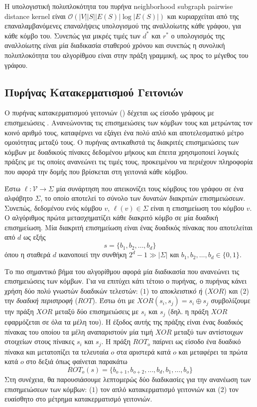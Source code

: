 Η υπολογιστική πολυπλοκότητα του πυρήνα neighborhood subgraph pairwise distance kernel είναι $\mathcal{O}(|V| |S| |E(S)| \log |E(S)|)$ και κυριαρχείται από της επαναλαμβανόμενες επαναλήψεις υπολογισμού της αναλλοίωτης κάθε γράφου, για κάθε κόμβο του.
Συνεπώς για μικρές τιμές των $d^*$ και $r^*$ ο υπολογισμός της αναλλοίωτης είναι μία διαδικασία σταθερού χρόνου και συνεπώς η συνολική πολυπλοκότητα του αλγορίθμου είναι στην πράξη γραμμική, ως προς το μέγεθος του γράφου.

\subsection{Πυρήνας Κατακερματισμού Γειτονιών}
\label{ssec:nh}
Ο πυρήνας κατακερματισμού γειτονιών () δέχεται ως είσοδο γράφους με επισημειώσεις \cite{Hido2009}.
Ανανεώνοντας τις επισημειώσεις των κόμβων τους και μετρώντας τον κοινό αριθμό τους, καταφέρνει να εξάγει ένα πολύ απλό και αποτελεσματικό μέτρο ομοιότητας μεταξύ τους.
Ο πυρήνας αντικαθιστά τις διακριτές επισημειώσεις των κόμβων με δυαδικούς πίνακες δεδομένου μήκους και έπειτα χρησιμοποιεί λογικές πράξεις με τις οποίες ανανεώνει τις τιμές τους, προκειμένου να περιέχουν πληροφορία που αφορά την δομής που βρίσκεται στη γειτονιά κάθε κόμβου.

Έστω $\ell : \mathcal{V} \rightarrow \Sigma$ μία συνάρτηση που απεικονίζει τους κόμβους του γράφου σε ένα αλφάβητο $\Sigma$, το οποίο αποτελεί το σύνολο των δυνατών διακριτών επισημειώσεων.
Συνεπώς, δεδομένου ενός κόμβου $v$, $\ell(v) \in \Sigma$  είναι η επισημείωση του κόμβου $v$.
Ο αλγόριθμος πρώτα μετασχηματίζει κάθε διακριτό κόμβο σε μία δυαδική επισημείωση.
Μία διακριτή επισημείωση είναι ένας δυαδικός πίνακας που αποτελείται από $d$  ως εξής
\begin{equation*}
    s = \{ b_1, b_2, \ldots, b_d \}
\end{equation*}
όπου η σταθερά $d$ ικανοποιεί την συνθήκη $2^d - 1 \gg |\Sigma|$ και $b_1, b_2, \ldots, b_d \in \{0, 1\}$.

Το πιο σημαντικό βήμα του αλγορίθμου αφορά μία διαδικασία που ανανεώνει τις επισημειώσεις των κόμβων.
Για να επιτύχει κάτι τέτοιο ο πυρήνας, ο πυρήνας κάνει χρήση δύο πολύ γνωστών δυαδικών τελεστών: ($1$) το \textit{αποκλειστικό ή} ($XOR$) και ($2$) την \textit{δυαδική περιστροφή} ($ROT$).
Έστω ότι με $XOR(s_i, s_j) = s_i \oplus s_j$ συμβολίζουμε την πράξη $XOR$ μεταξύ δύο επισημειώσεις με  $s_i$ και $s_j$ (δηλ. η πράξη $XOR$ εφαρμόζεται σε όλα τα μέλη του).
Η έξοδος αυτής της πράξης είναι ένας δυαδικός πίνακας του οποίου τα μέλη αναπαριστούν μία τιμή $XOR$ μεταξύ των αντίστοιχων στοιχείων στους πίνακες $s_i$ και $s_j$.
Η πράξη $ROT_o$ παίρνει ως είσοδο ένα δυαδικό πίνακα και μετατοπίζει τα τελευταία $o$  στα αριστερά κατά $o$  και μεταφέρει τα πρώτα κατά $o$ στο δεξιά όπως φαίνεται παρακάτω
\begin{equation}
    ROT_o(s) = \{ b_{o+1}, b_{o+2}, \ldots, b_d, b_1, \ldots, b_o \}
\end{equation}
Στη συνέχεια, θα παρουσιάσουμε λεπτομερώς δύο διαδικασίες για την ανανέωση των επισημειώσεων των κόμβων: ($1$) τον απλό κατακερματισμό γειτονιών και ($2$) τον ευαίσθητο στο μέτρημα κατακερματισμό γειτονιών.

